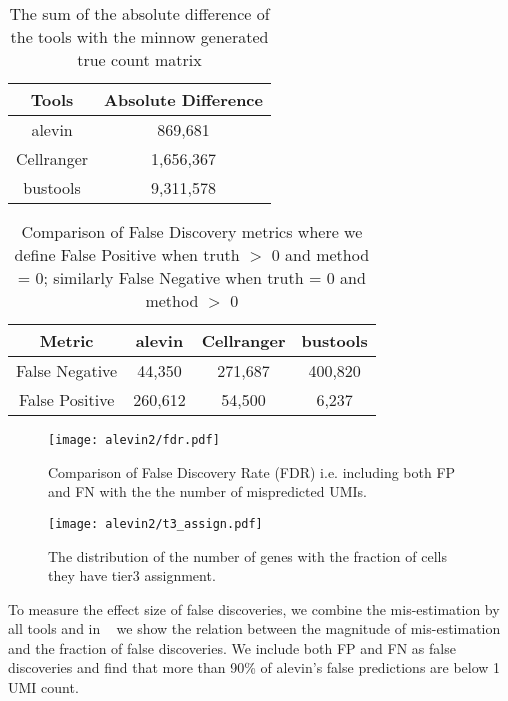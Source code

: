 \begin{table}[h!]
	\centering
	 \begin{tabular}{|| c | c||} 
		 \hline
		 Tools & Absolute Difference \\ [0.5ex] 
		 \hline\hline
		 alevin & 869,681 \\
		 \hline
		 Cellranger & 1,656,367 \\
		 \hline
		 bustools & 9,311,578 \\ [1ex] 
		 \hline
 	\end{tabular}
	\caption{The sum of the absolute difference of the tools with the minnow generated 
	true count matrix }
	\label{tab:matrix_diff}
\end{table}

\begin{table}[h!]
	\centering
	 \begin{tabular}{|| c | c | c | | c||} 
		 \hline
		 Metric & alevin & Cellranger & bustools \\ [0.5ex] 
		 \hline\hline
		 False Negative & 44,350 & 271,687 & 400,820 \\
		 \hline
		 False Positive & 260,612 & 54,500 & 6,237 \\ [1ex] 
		 \hline
 	\end{tabular}
	\caption{Comparison of False Discovery metrics where we define False Positive when truth 
	$>$ 0 and method = 0; similarly False Negative when truth = 0 and method $>$ 0}
	\label{tab:f1}
\end{table}

  \begin{figure}[!htb]
      \centering
    \texttt{[image: alevin2/fdr.pdf]}
    \caption{ Comparison of False Discovery Rate (FDR) i.e. including both FP and FN with the
	the number of mispredicted UMIs. }
    \label{fig:alv2_fdr}
  \end{figure}

  \begin{figure}[!htb]
      \centering
    \texttt{[image: alevin2/t3\_assign.pdf]}
    \caption{ The distribution of the number of genes with the fraction of cells they have tier3
	assignment.}
    \label{fig:alv2_t3}
  \end{figure}

To measure the effect size of false discoveries, we combine the mis-estimation by all tools
and in ~ we show the relation between the magnitude of mis-estimation and the fraction of 
false discoveries. We include both FP and FN as false discoveries and find that more than 90\% of alevin's 
false predictions are below 1 UMI count. 

